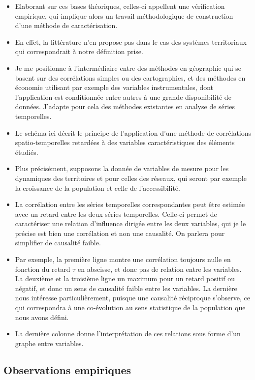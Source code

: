 \documentclass[12pt]{article}
\begin{document}
\begin{itemize}
	\item Elaborant sur ces bases théoriques, celles-ci appellent une vérification empirique, qui implique alors un travail méthodologique de construction d'une méthode de caractérisation.
	\item En effet, la littérature n'en propose pas dans le cas des systèmes territoriaux qui correspondrait à notre définition prise.
	\item Je me positionne à l'intermédiaire entre des méthodes en géographie qui se basent sur des corrélations simples ou des cartographies, et des méthodes en économie utilisant par exemple des variables instrumentales, dont l'application est conditionnée entre autres à une grande disponibilité de données. J'adapte pour cela des méthodes existantes en analyse de séries temporelles.
	\item Le schéma ici décrit le principe de l'application d'une méthode de corrélations spatio-temporelles retardées à des variables caractéristiques des éléments étudiés.
	\item Plus précisément, supposons la donnée de variables de mesure pour les dynamiques des territoires et pour celles des réseaux, qui seront par exemple la croissance de la population et celle de l'accessibilité.
	\item La corrélation entre les séries temporelles correspondantes peut être estimée avec un retard entre les deux séries temporelles. Celle-ci permet de caractériser une relation d'influence dirigée entre les deux variables, qui je le précise est bien une corrélation et non une causalité. On parlera pour simplifier de causalité faible.
	\item Par exemple, la première ligne montre une corrélation toujours nulle en fonction du retard $\tau$ en abscisse, et donc pas de relation entre les variables. La deuxième et la troisième ligne un maximum pour un retard positif ou négatif, et donc un sens de causalité faible entre les variables. La dernière nous intéresse particulièrement, puisque une causalité réciproque s'observe, ce qui correspondra à une co-évolution au sens statistique de la population que nous avons défini.
	\item La dernière colonne donne l'interprétation de ces relations sous forme d'un graphe entre variables.
\end{itemize}



\newpage

\subsection*{Observations empiriques}
\end{document}
